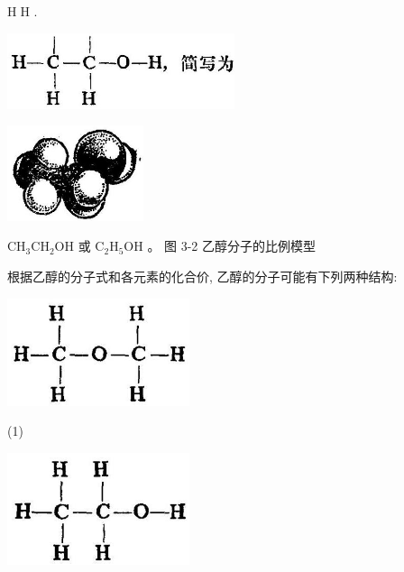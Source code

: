 \documentclass[10pt]{article}
\begin{document}
\(\mathrm{H}\;\mathrm{H}\) .

\begin{center}
\includegraphics[max width=0.5\textwidth]{images/01912d16-be99-77bb-9535-4f3ed8d9946f_113_708438.jpg}
\end{center}

\begin{center}
\includegraphics[max width=0.3\textwidth]{images/01912d16-be99-77bb-9535-4f3ed8d9946f_113_160778.jpg}
\end{center}

\({\mathrm{{CH}}}_{3}{\mathrm{{CH}}}_{2}\mathrm{{OH}}\) 或 \({\mathrm{C}}_{2}{\mathrm{H}}_{5}\mathrm{{OH}}\) 。 图 3-2 乙醇分子的比例模型

根据乙醇的分子式和各元素的化合价, 乙醇的分子可能有下列两种结构:

\begin{center}
\includegraphics[max width=0.4\textwidth]{images/01912d16-be99-77bb-9535-4f3ed8d9946f_113_657085.jpg}
\end{center}

(1)

\begin{center}
\includegraphics[max width=0.4\textwidth]{images/01912d16-be99-77bb-9535-4f3ed8d9946f_113_502092.jpg}
\end{center}
\end{document}
